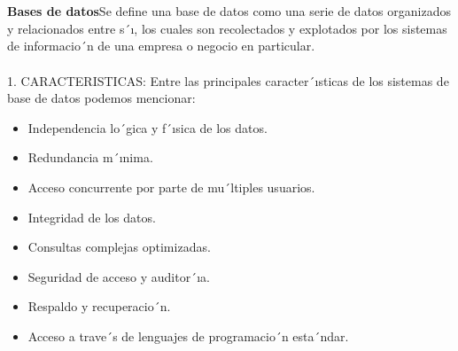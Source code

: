 \documentclass[conference,compsoc,onecolumn]{IEEEtran}
\begin{document}
\\
\\
\textbf{Bases de datos}Se define una base de datos como una serie de datos organizados y relacionados entre s´ı, los cuales son recolectados y explotados por los sistemas de informacio´n de una empresa o negocio en particular. 
\\
\\
1.	CARACTERISTICAS: Entre las principales caracter´ısticas de los sistemas de base de datos podemos mencionar:
\begin{itemize}
    \item Independencia lo´gica y f´ısica de los datos.
    \item Redundancia m´ınima.
    \item Acceso concurrente por parte de mu´ltiples usuarios.
    \item Integridad de los datos.
    \item Consultas complejas optimizadas.
    \item Seguridad de acceso y auditor´ıa.
    \item Respaldo y recuperacio´n.
    \item Acceso a trave´s de lenguajes de programacio´n esta´ndar.
    \\
    \\
\end{itemize}
\end{document}

